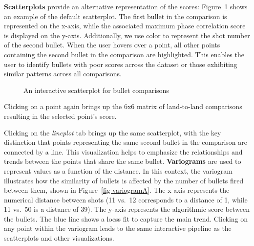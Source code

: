 \documentclass[
  12pt]{article}
\begin{document}
\textbf{Scatterplots} provide an alternative representation of the
scores: Figure~\ref{fig-scatterplot} shows an example of the default
scatterplot. The first bullet in the comparison is represented on the
x-axis, while the associated maximum phase correlation score is
displayed on the y-axis. Additionally, we use color to represent the
shot number of the second bullet. When the user hovers over a point, all
other points containing the second bullet in the comparison are
highlighted. This enables the user to identify bullets with poor scores
across the dataset or those exhibiting similar patterns across all
comparisons.

\begin{figure}[H]


\caption{\label{fig-scatterplot}An interactive scatterplot for bullet
comparisons}

\end{figure}%

Clicking on a point again brings up the 6x6 matrix of land-to-land
comparisons resulting in the selected point's score.

Clicking on the \emph{lineplot} tab brings up the same scatterplot, with
the key distinction that points representing the same second bullet in
the comparison are connected by a line. This visualization helps to
emphasize the relationships and trends between the points that share the
same bullet. \hfill\newline \textbf{Variograms} are used to represent
values as a function of the distance. In this context, the variogram
illustrates how the similarity of bullets is affected by the number of
bullets fired between them, shown in Figure~\ref{fig-variogramA}. The
x-axis represents the numerical distance between shots (11 vs.~12
corresponds to a distance of 1, while 11 vs.~50 is a distance of 39).
The y-axis represents the algorithmic score between the bullets. The
blue line shows a loess fit to capture the main trend. Clicking on any
point within the variogram leads to the same interactive pipeline as the
scatterplots and other visualizations.
\end{document}
